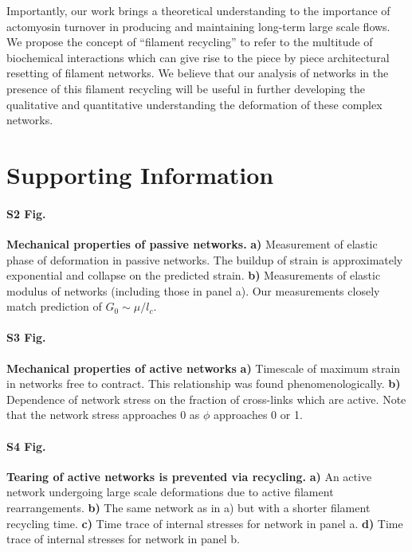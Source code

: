 \documentclass[10pt,letterpaper]{article}
\begin{document}
Importantly, our work brings a theoretical understanding to the importance of actomyosin turnover in producing and maintaining long-term large scale flows.  We propose the concept of ``filament recycling'' to refer to the multitude of biochemical interactions which can give rise to the piece by piece architectural resetting of filament networks.  We believe that our analysis of networks in the presence of this filament recycling will be useful in further developing the qualitative and quantitative understanding the deformation of these complex networks.

\section*{Supporting Information}


\paragraph*{S2 Fig.}
\label{fig:passive_supp}
{\bf  Mechanical properties of passive networks.}  \textbf{a)} Measurement of elastic phase of deformation in passive networks.  The buildup of strain is approximately exponential and collapse on the predicted strain.  \textbf{b)}  Measurements of elastic modulus of networks (including those in panel a).  Our measurements closely match prediction of $G_0\sim \mu/l_c$.

\paragraph*{S3 Fig.}
\label{fig:active_supp}
{\bf Mechanical properties of active networks } \textbf{a)}  Timescale of maximum strain in networks free to contract.  This relationship was found phenomenologically.  \textbf{b)}  Dependence of network stress on the fraction of cross-links which are active.  Note that the network stress approaches 0 as $\phi$ approaches 0 or 1.

\paragraph*{S4 Fig.}
\label{fig:tear_supp}
{\bf  Tearing of active networks is prevented via recycling. } \textbf{a)}  An active network undergoing large scale deformations due to active filament rearrangements.  \textbf{b)}  The same network as in a) but with a shorter filament recycling time.  \textbf{c)}  Time trace of internal stresses for network in panel a.  \textbf{d)}   Time trace of internal stresses for network in panel b. 
\end{document}

